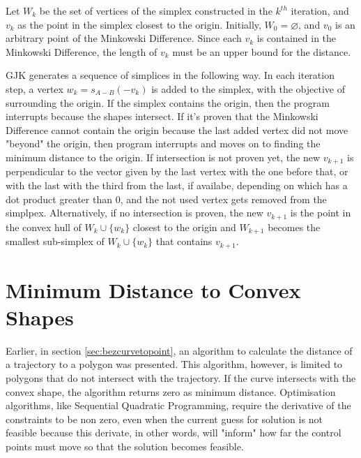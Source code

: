 \par Let $W_k$ be the set of vertices of the simplex constructed in the $k^{th}$ iteration, and $v_k$ as the point in the simplex closest to the origin. Initially, $W_0=\varnothing$, and $v_0$ is an arbitrary point of the Minkowski Difference. Since each $v_k$ is contained in the Minkowski Difference, the length of $v_k$ must be an upper bound for the distance.
\par \ac{GJK} generates a sequence of simplices in the following way. In each iteration step, a vertex $w_k = s_{A-B}(-v_k)$ is added to the simplex, with the objective of surrounding the origin. If the simplex contains the origin, then the program interrupts because the shapes intersect. If it's proven that the Minkowski Difference cannot contain the origin because the last added vertex did not move "beyond" the origin, then program interrupts and moves on to finding the minimum distance to the origin. If intersection is not proven yet, the new $v_{k+1}$ is perpendicular to the vector given by the last vertex with the one before that, or with the last with the third from the last, if availabe, depending on which has a dot product greater than 0, and the not used vertex gets removed from the simplpex. Alternatively, if no intersection is proven, the new $v_{k+1}$ is the point in the convex hull of $W_k\cup \{w_k\}$ closest to the origin and $W_{k+1}$ becomes the smallest sub-simplex of $W_k\cup \{w_k\}$ that contains $v_{k+1}$.


\section{Minimum Distance to Convex Shapes}

\par Earlier, in section \ref{sec:bezcurvetopoint}, an algorithm to calculate the distance of a trajectory to a polygon was presented. This algorithm, however, is limited to polygons that do not intersect with the trajectory. If the curve intersects with the convex shape, the algorithm returns zero as minimum distance. Optimisation algorithms, like Sequential Quadratic Programming, require the derivative of the constraints to be non zero, even when the current guess for solution is not feasible because this derivate, in other words, will "inform" how far the control points must move so that the solution becomes feasible.

